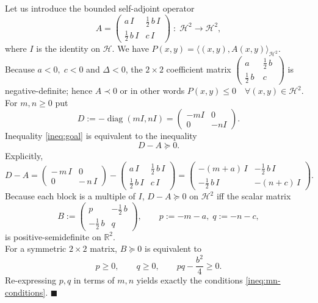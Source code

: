 \documentclass[11pt]{article}
\numberwithin{equation}{section}
\newenvironment{proof}{\bigskip\noindent{\bf Proof.}}{\hfill $\blacksquare$ \par\bigskip\noindent}
\begin{document}
\begin{proof}
Let us introduce the bounded self-adjoint operator
\[
A=
\begin{pmatrix}
a\,I & \tfrac12\,b\,I \\
\tfrac12\,b\,I & c\,I
\end{pmatrix}\;:\;\mathcal H^{2}\longrightarrow\mathcal H^{2},
\]
where $I$ is the identity on $\mathcal{H}$. We have 
\(
P(x,y)=\bigl\langle (x,y),A(x,y)\bigr\rangle_{\mathcal H^{2}}.
\)
Because $a<0,\;c<0$ and $\Delta<0$, the $2\times2$ coefficient matrix $\begin{pmatrix}
a & \tfrac12\,b\ \\
\tfrac12\,b\ & c\
\end{pmatrix}$ is
negative-definite; hence $A\prec0$ or in other words $P(x,y) \le 0 \quad \forall (x,y)\in \mathcal{H}^2$. \\[2mm]
For $m,n\ge0$ put
\[
D:=-\operatorname{diag}(mI,nI)=
\begin{pmatrix}-mI&0\\0&-nI\end{pmatrix}.
\]
Inequality \eqref{ineq:goal} is equivalent to the inequality
\begin{equation}\label{ineq:loewner}
D-A\succeq0 .
\end{equation}
\medskip
Explicitly,
\[
D-A=
\begin{pmatrix}
-\,m\,I & 0\\
0 & -\,n\,I
\end{pmatrix}
-
\begin{pmatrix}
a\,I & \tfrac12\,b\,I\\
\tfrac12\,b\,I & c\,I
\end{pmatrix}
=
\begin{pmatrix}
-(m+a)\,I & -\tfrac12\,b\,I\\[4pt]
-\tfrac12\,b\,I & -(n+c)\,I
\end{pmatrix}.
\]
Because each block is a multiple of $I$, $D-A\succeq0$ on $\mathcal H^{2}$
{iff} the scalar matrix
\[
B:=
\begin{pmatrix}
p & -\tfrac12\,b\\[4pt]
-\tfrac12\,b & q
\end{pmatrix},
\qquad
p:=-m-a,\; q:=-n-c,
\]
is positive-semidefinite on $\mathbb R^{2}$.\\
\medskip
For a symmetric $2\times2$ matrix, $B\succeq0$ is equivalent to
\[
p\ge0,\qquad q\ge0,\qquad pq-\frac{b^{2}}{4}\ge0.
\]
Re-expressing $p,q$ in terms of $m,n$ yields exactly the conditions
\eqref{ineq:mn-conditions}.
\end{proof}
\end{document}
